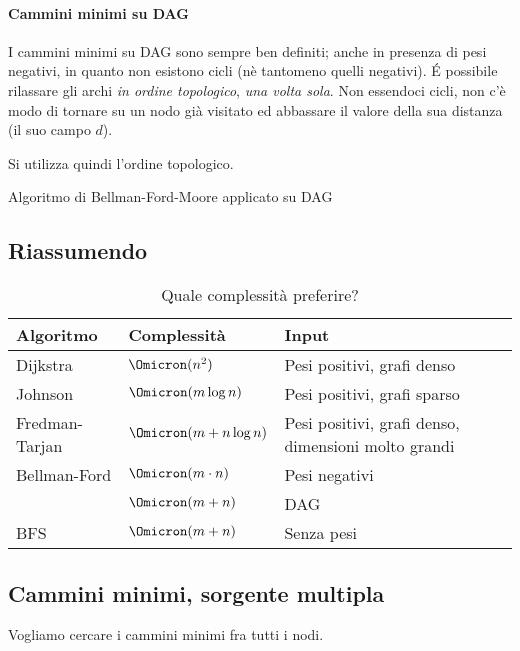 \paragraph{Cammini minimi su DAG}
I cammini minimi su DAG sono sempre ben definiti;
anche in presenza di pesi negativi, in quanto non esistono cicli (nè tantomeno quelli negativi).
\'E possibile rilassare gli archi \emph{in ordine topologico}, \emph{una volta sola}.
Non essendoci cicli, non c'è modo di tornare su un nodo già visitato ed abbassare il valore della sua distanza (il suo campo \(d\)).

Si utilizza quindi l'ordine topologico.

\begin{algorithm}[H]
	\caption{Algoritmo di Bellman-Ford-Moore applicato su DAG}
	
\end{algorithm}

\newpage
\subsection{Riassumendo}

\begin{table}[H]\centering
\caption{Quale complessità preferire?}%
\label{tab:complexity-compared}
\begin{tabularx}{\textwidth}{@{} *{4}{l} @{}}
	\toprule
		\textbf{Algoritmo} & \textbf{Complessità} & \textbf{Input}\\
	\midrule
		Dijkstra		& \(\Omicron(n^2)\)				& Pesi positivi, grafi denso  \\
	\lightrule
		Johnson			& \(\Omicron(m \log n)\)		& Pesi positivi, grafi sparso \\
	\lightrule
		Fredman-Tarjan	& \(\Omicron(m + n \log n)\)	& Pesi positivi, grafi denso, dimensioni molto grandi \\
	\lightrule
		Bellman-Ford	& \(\Omicron(m \cdot n)\)		& Pesi negativi \\
						& \(\Omicron(m + n)\)			& DAG			\\
					\lightrule
		BFS				& \(\Omicron(m + n)\)			& Senza pesi	\\
	\bottomrule
\end{tabularx}
\end{table}

\subsection{Cammini minimi, sorgente multipla}

Vogliamo cercare i cammini minimi fra tutti i nodi.

